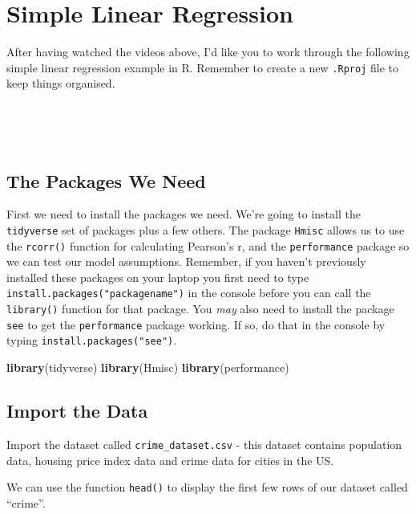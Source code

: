 \documentclass[
]{book}
\newenvironment{Shaded}{\begin{snugshade}}{\end{snugshade}}
\newcommand{\FunctionTok}[1]{\textcolor[rgb]{0.13,0.29,0.53}{\textbf{#1}}}
\newcommand{\NormalTok}[1]{#1}
\begin{document}
\hypertarget{simple-linear-regression}{%
\section{Simple Linear Regression}\label{simple-linear-regression}}

After having watched the videos above, I'd like you to work through the following simple linear regression example in R. Remember to create a new \texttt{.Rproj} file to keep things organised.

~~

~~

\hypertarget{the-packages-we-need}{%
\subsection{The Packages We Need}\label{the-packages-we-need}}

First we need to install the packages we need. We're going to install the \texttt{tidyverse} set of packages plus a few others. The package \texttt{Hmisc} allows us to use the \texttt{rcorr()} function for calculating Pearson's r, and the \texttt{performance} package so we can test our model assumptions. Remember, if you haven't previously installed these packages on your laptop you first need to type \texttt{install.packages("packagename")} in the console before you can call the \texttt{library()} function for that package. You \emph{may} also need to install the package \texttt{see} to get the \texttt{performance} package working. If so, do that in the console by typing \texttt{install.packages("see")}.

\begin{Shaded}
\begin{Highlighting}[]
\FunctionTok{library}\NormalTok{(tidyverse)}
\FunctionTok{library}\NormalTok{(Hmisc)}
\FunctionTok{library}\NormalTok{(performance)}
\end{Highlighting}
\end{Shaded}

\hypertarget{import-the-data}{%
\subsection{Import the Data}\label{import-the-data}}

Import the dataset called \texttt{crime\_dataset.csv} - this dataset contains population data, housing price index data and crime data for cities in the US.

We can use the function \texttt{head()} to display the first few rows of our dataset called ``crime''.
\end{document}
